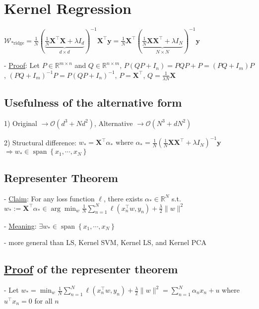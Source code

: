 \section{Kernel Regression}
$
\mathcal{W}_{*\text{ridge}}=\frac{1}{N}(\underbrace{\frac{1}{N} \mathbf{X}^{\top} \mathbf{X}+\lambda I_{d}}_{d \times d})^{-1} \mathbf{X}^{\top} \mathbf{y}
=\frac{1}{N} \mathbf{X}^{\top}(\underbrace{\frac{1}{N} \mathbf{X X}^{\top}+\lambda I_{N}}_{N \times N})^{-1} \mathbf{y}
$

- \underline{Proof}: Let $P \in \mathbb{R}^{m \times n}$ and $Q \in \mathbb{R}^{n \times m}$,
$
P\left(Q P+I_{n}\right)=P Q P+P=\left(P Q+I_{m}\right) P
$,
$
\left(P Q+I_{m}\right)^{-1} P=P\left(Q P+I_{n}\right)^{-1}
$,
$P=\mathbf{X}^{\top}$, $Q=\frac{1}{\lambda N} \mathbf{X}$

\subsection*{Usefulness of the alternative form}

1) Original $\rightarrow \mathcal{O}\left(d^{3}+N d^{2}\right)$,
Alternative $\rightarrow \mathcal{O}\left(N^{3}+d N^{2}\right)$


2) Structural difference:
$
w_{*}=\mathbf{X}^{\top} \alpha_{*} \text { where } \alpha_{*}=\frac{1}{N}\left(\frac{1}{N} \mathbf{X} \mathbf{X}^{\top}+\lambda I_{N}\right)^{-1} \mathbf{y}
$
$\Rightarrow w_{*} \in \operatorname{span}\left\{x_{1}, \cdots, x_{N}\right\}$


\subsection*{Representer Theorem}
- \underline{Claim}: For any loss function $\ell$, there exists $\alpha_{*} \in \mathbb{R}^{N}$ s.t.
$
w_{*}:=\mathbf{X}^{\top} \alpha_{*} \in \arg \min _{w} \frac{1}{N} \sum_{n=1}^{N} \ell\left(x_{n}^{\top} w, y_{n}\right)+\frac{\lambda}{2}\|w\|^{2}
$

- \underline{Meaning}: $\exists w_* \in \operatorname{span}\left\{x_{1}, \cdots, x_{N}\right\}$

- more general than LS, Kernel SVM, Kernel LS, and Kernel PCA

\subsection*{\underline{Proof} of the representer theorem}
- Let $w_{*}=\min _{w} \frac{1}{N} \sum_{n=1}^{N} \ell\left(x_{n}^{\top} w, y_{n}\right)+\frac{\lambda}{2}\|w\|^{2}=\sum_{n=1}^{N} \alpha_{n} x_{n}+u$ where $u^{\top} x_{n}=0$ for all $n$

